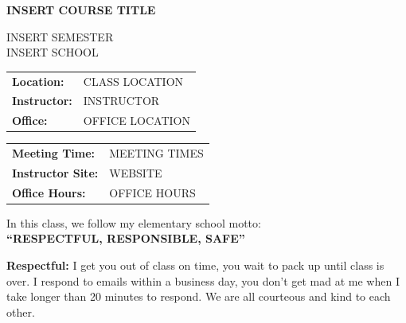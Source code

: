 \documentclass[12pt]{article}
\begin{document}
\begin{center}
    \textbf{INSERT COURSE TITLE}

    INSERT SEMESTER \\
    INSERT SCHOOL \\
\end{center}


\begin{minipage}[t]{0.45\textwidth}
    \begin{tabular}{@{} l l}
        \textbf{Location:}   & CLASS LOCATION \\
        \textbf{Instructor:} & INSTRUCTOR \\
        \textbf{Office:}     & OFFICE LOCATION
    \end{tabular}
\end{minipage}
\hfill
\begin{minipage}[t]{0.50\textwidth}
    \begin{tabular}{@{} l l}
        \textbf{Meeting Time:}      & MEETING TIMES \\
        \textbf{Instructor Site:}   & WEBSITE \\
        \textbf{Office Hours:}      & OFFICE HOURS
    \end{tabular}
\end{minipage}
\bigbreak
\noindent\makebox[\linewidth]{\rule{0.9\paperwidth}{1pt}}
\begin{center} In this class, we follow my elementary school motto: \\ \textbf{``RESPECTFUL, RESPONSIBLE, SAFE''} \end{center}
\bigbreak

\textbf{Respectful:} I get you out of class on time, you wait to pack up until class is over. I respond to emails within a business day, you don't get mad at me when I take longer than 20 minutes to respond. We are all courteous and kind to each other.
\end{document}
